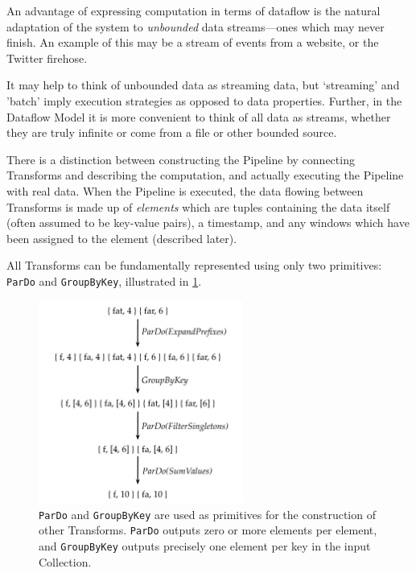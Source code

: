 An advantage of expressing computation in terms of dataflow is the natural adaptation of the system to \emph{unbounded} data streams---ones which may never finish.
An example of this may be a stream of events from a website, or the Twitter firehose.

It may help to think of unbounded data as streaming data, but `streaming' and 'batch' imply execution strategies as opposed to data properties.
Further, in the Dataflow Model it is more convenient to think of all data as streams, whether they are truly infinite or come from a file or other bounded source.

There is a distinction between constructing the Pipeline by connecting Transforms and describing the computation, and actually executing the Pipeline with real data.
When the Pipeline is executed, the data flowing between Transforms is made up of \emph{elements} which are tuples containing the data itself (often assumed to be key-value pairs), a timestamp, and any windows which have been assigned to the element (described later).

All Transforms can be fundamentally represented using only two primitives: \verb|ParDo| and \verb|GroupByKey|, illustrated in \cref{fig:prep:pardo-gbk}.

\begin{figure}
	\centering
	\includegraphics[width=0.6\textwidth]{images/diags/pardo-gbk}
	\caption[An illustration of the operation of \texttt{ParDo} and \texttt{GroupByKey}.]{\texttt{ParDo} and \texttt{GroupByKey} are used as primitives for the construction of other Transforms. \texttt{ParDo} outputs zero or more elements per element, and \texttt{GroupByKey} outputs precisely one element per key in the input Collection.}
	\label{fig:prep:pardo-gbk}
\end{figure}

